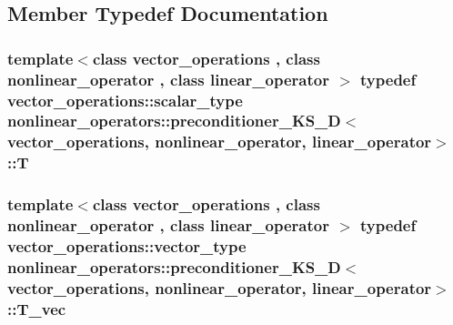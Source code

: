 \subsection{Member Typedef Documentation}
\hypertarget{classnonlinear__operators_1_1preconditioner__KS__2D_abdcb08394518180c04171faec737cd43}{
\subsubsection[{T}]{\setlength{\rightskip}{0pt plus 5cm}template$<$class vector\-\_\-operations , class nonlinear\-\_\-operator , class linear\-\_\-operator $>$ typedef {\bf vector\-\_\-operations\-::scalar\-\_\-type} {\bf nonlinear\-\_\-operators\-::preconditioner\-\_\-\-K\-S\-\_\-D}$<$ {\bf vector\-\_\-operations}, nonlinear\-\_\-operator, linear\-\_\-operator$>$\-::{\bf T}}}\label{classnonlinear__operators_1_1preconditioner__KS__2D_abdcb08394518180c04171faec737cd43}
\hypertarget{classnonlinear__operators_1_1preconditioner__KS__2D_ac8a7bc16e8f8296371167534fe482263}{
\subsubsection[{T\-\_\-vec}]{\setlength{\rightskip}{0pt plus 5cm}template$<$class vector\-\_\-operations , class nonlinear\-\_\-operator , class linear\-\_\-operator $>$ typedef {\bf vector\-\_\-operations\-::vector\-\_\-type} {\bf nonlinear\-\_\-operators\-::preconditioner\-\_\-\-K\-S\-\_\-D}$<$ {\bf vector\-\_\-operations}, nonlinear\-\_\-operator, linear\-\_\-operator$>$\-::{\bf T\-\_\-vec}}}\label{classnonlinear__operators_1_1preconditioner__KS__2D_ac8a7bc16e8f8296371167534fe482263}


